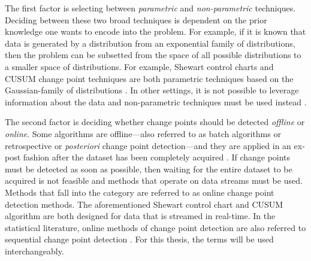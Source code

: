 The first factor is selecting between \textit{parametric} and \textit{non-parametric} techniques. Deciding between these two broad techniques is dependent on the prior knowledge one wants to encode into the problem. For example, if it is known that data is generated by a distribution from an exponential family of distributions, then the problem can be subsetted from the space of all possible distributions to a smaller space of distributions. For example, Shewart control charts and CUSUM change point techniques are both parametric techniques based on the Gaussian-family of distributions \cite{page1954continuous} \cite{chen2011parametric}. In other settings, it is not possible to leverage information about the data and non-parametric techniques must be used instead \cite{brodsky2013nonparametric}.


The second factor is deciding whether change points should be detected \textit{offline} or \textit{online}. Some algorithms are offline---also referred to  as batch algorithms or retrospective or \textit{posteriori} change point detection---and they are applied in an ex-post fashion after the dataset has been completely acquired \cite{truong2018review}. If change points must be detected as soon as possible, then waiting for the entire dataset to be acquired is not feasible and methods that operate on data streams must be used. Methods that fall into the category are referred to as online change point detection methods. The aforementioned Shewart control chart and CUSUM algorithm are both designed for data that is streamed in real-time. In the statistical literature, online methods of change point detection are also referred to sequential change point detection  \cite{tartakovsky2014sequential}. For this thesis, the terms will be used interchangeably.%

